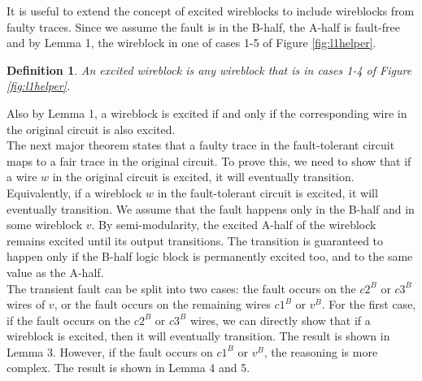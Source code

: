 \documentclass[12pt]{report}
\newtheorem*{definition}{Definition}
\begin{document}
It is useful to extend the concept of excited wireblocks to include wireblocks from faulty traces.  Since we assume the fault is in the B-half, the A-half is fault-free and by Lemma 1, the wireblock in one of cases 1-5 of Figure \ref{fig:l1helper}.  
\begin{definition}
An {\em excited wireblock} is any wireblock that is in cases 1-4 of Figure \ref{fig:l1helper}.  
\end{definition}
Also by Lemma 1, a wireblock is excited if and only if the corresponding wire in the original circuit is also excited.\\

The next major theorem states that a faulty trace in the fault-tolerant circuit maps to a fair trace in the original circuit. To prove this, we need to show that if a wire $w$ in the original circuit is excited, it will eventually transition.  Equivalently, if a wireblock $w$ in the fault-tolerant circuit is excited, it will eventually transition. We assume that the fault happens only in the B-half and in some wireblock $v$. By semi-modularity, the excited A-half of the wireblock remains excited until its output transitions. The transition is guaranteed to happen only if the B-half logic block is permanently excited too, and to the same value as the A-half.\\

The transient fault can be split into two cases: the fault occurs on the $c2^B$ or $c3^B$ wires of $v$, or the fault occurs on the remaining wires $c1^B$ or $v^B$. For the first case, if the fault occurs on the $c2^B$ or $c3^B$ wires, we can directly show that if a wireblock is excited, then it will eventually transition. The result is shown in Lemma 3. However, if the fault occurs on $c1^B$ or $v^B$, the reasoning is more complex. The result is shown in Lemma 4 and 5.\\
\end{document}
